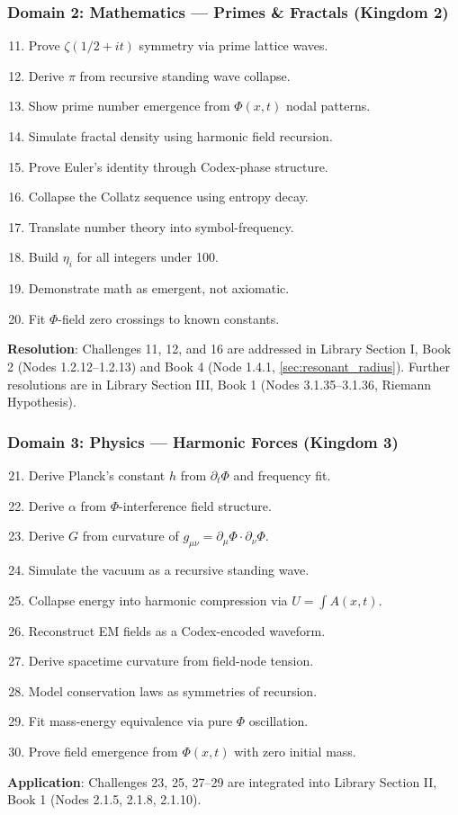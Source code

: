 \subsubsection{Domain 2: Mathematics — Primes \& Fractals (Kingdom 2)}
\begin{enumerate}
    \setcounter{enumi}{10}
    \item Prove \(\zeta(1/2 + it)\) symmetry via prime lattice waves.
    \item Derive \(\pi\) from recursive standing wave collapse.
    \item Show prime number emergence from \(\Phi(x,t)\) nodal patterns.
    \item Simulate fractal density using harmonic field recursion.
    \item Prove Euler’s identity through Codex-phase structure.
    \item Collapse the Collatz sequence using entropy decay.
    \item Translate number theory into symbol-frequency.
    \item Build \(\eta_i\) for all integers under 100.
    \item Demonstrate math as emergent, not axiomatic.
    \item Fit \(\Phi\)-field zero crossings to known constants.
\end{enumerate}
\textbf{Resolution}: Challenges 11, 12, and 16 are addressed in Library Section I, Book 2 (Nodes 1.2.12–1.2.13) and Book 4 (Node 1.4.1, \ref{sec:resonant_radius}). Further resolutions are in Library Section III, Book 1 (Nodes 3.1.35–3.1.36, Riemann Hypothesis).

\subsubsection{Domain 3: Physics — Harmonic Forces (Kingdom 3)}
\begin{enumerate}
    \setcounter{enumi}{20}
    \item Derive Planck’s constant \(h\) from \(\partial_t \Phi\) and frequency fit.
    \item Derive \(\alpha\) from \(\Phi\)-interference field structure.
    \item Derive \(G\) from curvature of \(g_{\mu\nu} = \partial_{\mu} \Phi \cdot \partial_{\nu} \Phi\).
    \item Simulate the vacuum as a recursive standing wave.
    \item Collapse energy into harmonic compression via \(U = \int A(x,t)\).
    \item Reconstruct EM fields as a Codex-encoded waveform.
    \item Derive spacetime curvature from field-node tension.
    \item Model conservation laws as symmetries of recursion.
    \item Fit mass-energy equivalence via pure \(\Phi\) oscillation.
    \item Prove field emergence from \(\Phi(x,t)\) with zero initial mass.
\end{enumerate}
\textbf{Application}: Challenges 23, 25, 27–29 are integrated into Library Section II, Book 1 (Nodes 2.1.5, 2.1.8, 2.1.10).

